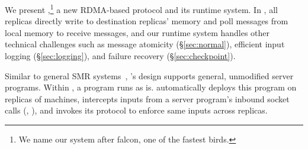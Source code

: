 We present \xxx,\footnote{We name our system after
falcon, one of the fastest birds.} a new RDMA-based \paxos protocol and its
runtime system. In \xxx, all replicas directly write to destination
replicas' memory and poll messages from local memory to receive messages, and 
our runtime system handles other technical challenges such as message 
atomicity (\S\ref{sec:normal}), efficient input logging (\S\ref{sec:logging}), 
and failure recovery (\S\ref{sec:checkpoint}).

Similar to general SMR systems~\cite{rex:eurosys14,crane:sosp15},
\xxx's design supports general, unmodified server programs. Within \xxx, a
program runs as is. \xxx automatically deploys this program on replicas
of machines, intercepts inputs from a server program's 
inbound socket calls (\eg, \recv), and invokes its \paxos protocol to enforce 
same inputs across replicas.






%



